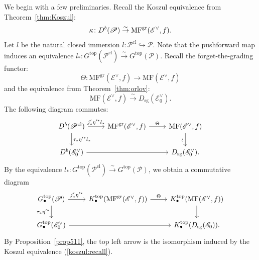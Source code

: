 \documentclass [11pt,oneside,a4paper,mathscr]{amsart}
\theoremstyle{definition}
\begin{document}
We begin with a few preliminaries. 
Recall the Koszul equivalence from Theorem~\ref{thm:Koszul}:
\begin{align}\label{koszul:recall}
    \kappa \colon D^b(\mathscr{P}) \stackrel{\sim}{\to}
    \mathrm{MF}^{\rm{gr}}(\mathscr{E}^{\vee}, f). 
\end{align}
Let $l$ be the natural closed immersion $l\colon \mathscr{P}^{\mathrm{cl}}\hookrightarrow \mathscr{P}$.
Note that the pushforward map induces an equivalence $l_*\colon G^{\mathrm{top}}(\mathscr{P}^{\mathrm{cl}})\xrightarrow{\sim} G^{\mathrm{top}}(\mathscr{P})$.
Recall the forget-the-grading functor: 
\begin{equation}\label{forgetthepotential}
\Theta\colon \mathrm{MF}^{\mathrm{gr}}(\mathscr{E}^\vee, f)\to \mathrm{MF}(\mathscr{E}^\vee, f)
\end{equation}
and the equivalence from Theorem~\ref{thm:orlov}:
\[\mathrm{MF}(\mathscr{E}^\vee, f)\xrightarrow{\sim} D_{\mathrm{sg}}(\mathscr{E}^{\vee}_0).\]
The following diagram commutes:
\begin{equation*}
    \begin{tikzcd}
        D^b(\mathscr{P}^{\mathrm{cl}})\arrow[r, "j'_*\eta'^*l_*"]\arrow[d, "\tau_*\eta'^*l_*"]&
    \mathrm{MF}^{\mathrm{gr}}(\mathscr{E}^\vee, f)
    \arrow[r, "\Theta"]&
    \mathrm{MF}(\mathscr{E}^\vee, f)\arrow[d, "\sim"{anchor=south, rotate=90}]\\
D^b(\mathscr{E}^{\vee}_0)\arrow[rr]&&
    D_{\mathrm{sg}}(\mathscr{E}^{\vee}_0).
    \end{tikzcd}
\end{equation*}
By the equivalence $l_*\colon G^{\mathrm{top}}(\mathscr{P}^{\mathrm{cl}})\xrightarrow{\sim} G^{\mathrm{top}}(\mathscr{P})$, we obtain a commutative diagram
\begin{equation}\label{psi}
    \begin{tikzcd}
        G^{\mathrm{top}}_\bullet(\mathscr{P})\arrow[r, "j'_*\eta'^*"]\arrow[d, "\tau_*\eta'^*"']& K^{\mathrm{top}}_\bullet(\mathrm{MF}^{\mathrm{gr}}(\mathscr{E}^\vee, f))\arrow[r, "\Theta"]& K^{\mathrm{top}}_\bullet(\mathrm{MF}(\mathscr{E}^\vee, f))\arrow[d]\\
          G^{\mathrm{top}}_\bullet(\mathscr{E}^\vee_0)\arrow[rr]& &K^{\mathrm{top}}_\bullet(D_{\mathrm{sg}}(\mathscr{E}_0)).
    \end{tikzcd}
\end{equation}
By Proposition~\ref{prop511}, the top left arrow is 
the isomorphism induced by the Koszul equivalence (\ref{koszul:recall}). 
\end{document}
